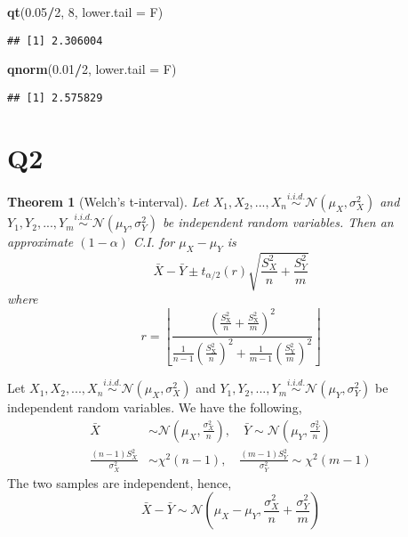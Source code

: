 \documentclass[
]{book}
\newenvironment{Shaded}{\begin{snugshade}}{\end{snugshade}}
\newcommand{\DataTypeTok}[1]{\textcolor[rgb]{0.13,0.29,0.53}{#1}}
\newcommand{\DecValTok}[1]{\textcolor[rgb]{0.00,0.00,0.81}{#1}}
\newcommand{\FloatTok}[1]{\textcolor[rgb]{0.00,0.00,0.81}{#1}}
\newcommand{\KeywordTok}[1]{\textcolor[rgb]{0.13,0.29,0.53}{\textbf{#1}}}
\newcommand{\NormalTok}[1]{#1}
\newcommand{\OperatorTok}[1]{\textcolor[rgb]{0.81,0.36,0.00}{\textbf{#1}}}
\newtheorem{theorem}{Theorem}[chapter]
\theoremstyle{definition}
\theoremstyle{definition}
\theoremstyle{definition}
\theoremstyle{remark}
\begin{document}
\begin{Shaded}
\begin{Highlighting}[]
\KeywordTok{qt}\NormalTok{(}\FloatTok{0.05}\OperatorTok{/}\DecValTok{2}\NormalTok{, }\DecValTok{8}\NormalTok{, }\DataTypeTok{lower.tail =}\NormalTok{ F)}
\end{Highlighting}
\end{Shaded}

\begin{verbatim}
## [1] 2.306004
\end{verbatim}

\begin{Shaded}
\begin{Highlighting}[]
\KeywordTok{qnorm}\NormalTok{(}\FloatTok{0.01}\OperatorTok{/}\DecValTok{2}\NormalTok{, }\DataTypeTok{lower.tail =}\NormalTok{ F)}
\end{Highlighting}
\end{Shaded}

\begin{verbatim}
## [1] 2.575829
\end{verbatim}

\hypertarget{q2-2}{%
\section{Q2}\label{q2-2}}

\begin{theorem}[Welch’s t-interval]
\protect\hypertarget{thm:unnamed-chunk-7}{}{\label{thm:unnamed-chunk-7} \iffalse (Welch's t-interval) \fi{} }Let \(X_1,X_2,...,X_n\stackrel{i.i.d.}{\sim}\mathcal{N}(\mu_X,\sigma^2_X)\) and \(Y_1,Y_2,...,Y_m\stackrel{i.i.d.}{\sim}\mathcal{N}(\mu_Y,\sigma^2_Y)\) be independent random variables. Then an approximate \((1-\alpha)\) C.I. for \(\mu_X-\mu_Y\) is
\[
  \bar{X}-\bar{Y} \pm t_{\alpha / 2}(r) \sqrt{\frac{S_{X}^{2}}{n}+\frac{S_{Y}^{2}}{m}}
\]
where
\[
  r=\left\lfloor\frac{\left(\frac{S_{\mathrm{X}}^{2}}{n}+\frac{S_{\mathrm{X}}^{2}}{m}\right)^{2}}{\frac{1}{n-1}\left(\frac{S_{\mathrm{X}}^{2}}{n}\right)^{2}+\frac{1}{m-1}\left(\frac{S_{\mathrm{Y}}^{2}}{m}\right)^{2}}\right\rfloor
\]
\end{theorem}

Let \(X_1,X_2,...,X_n\stackrel{i.i.d.}{\sim}\mathcal{N}(\mu_X,\sigma^2_X)\) and \(Y_1,Y_2,...,Y_m\stackrel{i.i.d.}{\sim}\mathcal{N}(\mu_Y,\sigma^2_Y)\) be independent random variables. We have the following,
\begin{align}
\bar X&\sim \mathcal{N}(\mu_X, \frac{\sigma_X^2}{n}), \quad 
\bar Y \sim \mathcal{N}(\mu_Y, \frac{\sigma_Y^2}{n})\\
\frac{(n-1)S^2_X}{\sigma_X^2} &\sim \chi^2(n-1), \quad \frac{(m-1)S^2_Y}{\sigma_Y^2} \sim \chi^2(m-1)
\end{align}
The two samples are independent, hence,
\begin{equation}
\bar X - \bar Y \sim \mathcal{N}(\mu_X-\mu_Y,\frac{\sigma_X^2}{n}+\frac{\sigma_Y^2}{m})
\end{equation}
\end{document}
